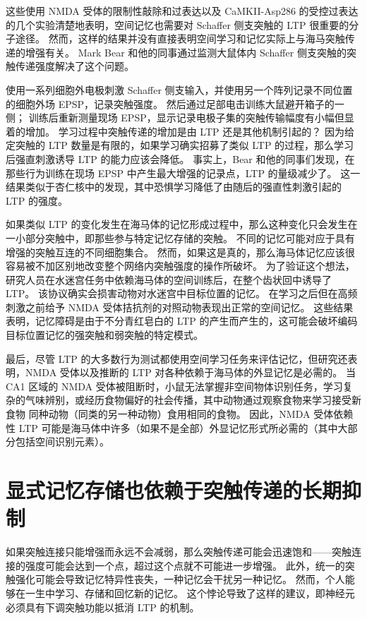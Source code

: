 这些使用 NMDA 受体的限制性敲除和过表达以及 CaMKII-Asp286 的受控过表达的几个实验清楚地表明，空间记忆也需要对 Schaffer 侧支突触的 LTP 很重要的分子途径。 然而，这样的结果并没有直接表明空间学习和记忆实际上与海马突触传递的增强有关。 Mark Bear 和他的同事通过监测大鼠体内 Schaffer 侧支突触的突触传递强度解决了这个问题。

使用一系列细胞外电极刺激 Schaffer 侧支输入，并使用另一个阵列记录不同位置的细胞外场 EPSP，记录突触强度。 然后通过足部电击训练大鼠避开箱子的一侧； 训练后重新测量现场 EPSP，显示记录电极子集的突触传输幅度有小幅但显着的增加。 学习过程中突触传递的增加是由 LTP 还是其他机制引起的？ 因为给定突触的 LTP 数量是有限的，如果学习确实招募了类似 LTP 的过程，那么学习后强直刺激诱导 LTP 的能力应该会降低。 事实上，Bear 和他的同事们发现，在那些行为训练在现场 EPSP 中产生最大增强的记录点，LTP 的量级减少了。 这一结果类似于杏仁核中的发现，其中恐惧学习降低了由随后的强直性刺激引起的 LTP 的强度。

如果类似 LTP 的变化发生在海马体的记忆形成过程中，那么这种变化只会发生在一小部分突触中，即那些参与特定记忆存储的突触。 不同的记忆可能对应于具有增强的突触互连的不同细胞集合。 然而，如果这是真的，那么海马体记忆应该很容易被不加区别地改变整个网络内突触强度的操作所破坏。 为了验证这个想法，研究人员在水迷宫任务中依赖海马体的空间训练后，在整个齿状回中诱导了 LTP。 该协议确实会损害动物对水迷宫中目标位置的记忆。 在学习之后但在高频刺激之前给予 NMDA 受体拮抗剂的对照动物表现出正常的空间记忆。 这些结果表明，记忆障碍是由于不分青红皂白的 LTP 的产生而产生的，这可能会破坏编码目标位置记忆的强突触和弱突触的特定模式。

最后，尽管 LTP 的大多数行为测试都使用空间学习任务来评估记忆，但研究还表明，NMDA 受体以及推断的 LTP 对各种依赖于海马体的外显记忆是必需的。 当 CA1 区域的 NMDA 受体被阻断时，小鼠无法掌握非空间物体识别任务，学习复杂的气味辨别，或经历食物偏好的社会传播，其中动物通过观察食物来学习接受新食物 同种动物（同类的另一种动物）食用相同的食物。 因此，NMDA 受体依赖性 LTP 可能是海马体中许多（如果不是全部）外显记忆形式所必需的（其中大部分包括空间识别元素）。

\section{显式记忆存储也依赖于突触传递的长期抑制}
如果突触连接只能增强而永远不会减弱，那么突触传递可能会迅速饱和——突触连接的强度可能会达到一个点，超过这个点就不可能进一步增强。 此外，统一的突触强化可能会导致记忆特异性丧失，一种记忆会干扰另一种记忆。 然而，个人能够在一生中学习、存储和回忆新的记忆。 这个悖论导致了这样的建议，即神经元必须具有下调突触功能以抵消 LTP 的机制。

